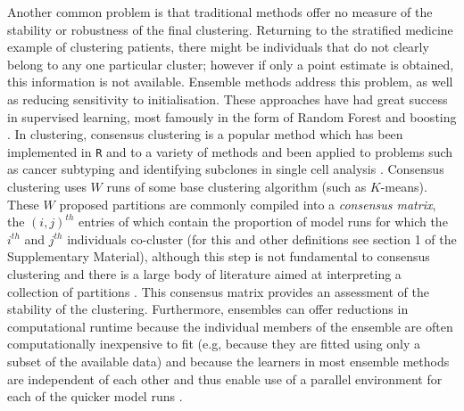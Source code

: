\documentclass{bmcart}
\begin{document}
Another common problem is that traditional methods offer  no  measure of the stability or robustness of the  final  clustering. Returning  to the  stratified  medicine example  of  clustering patients, there might be individuals that do not clearly belong to any one particular cluster; however if only a point estimate is obtained, this information is not available. %
Ensemble methods address this problem, as well as reducing sensitivity to initialisation. These approaches have had great success in supervised learning, most famously in the form of Random Forest \citep{breiman2001random} and boosting \citep{friedman2002stochastic}. In clustering, consensus clustering \citep{monti2003consensus} is a popular method which has been implemented in \texttt{R} \citep{wilkerson2010consensusclusterplus} and to a variety of methods \citep{john2020m3c, gu2020cola} and been applied to problems such as cancer subtyping \citep{lehmann2011identification, verhaak2010integrated} and identifying subclones in single cell analysis \citep{kiselev2017sc3}. Consensus clustering uses $W$ runs of some base clustering algorithm (such as $K$-means). These $W$ proposed partitions are commonly compiled into a \emph{consensus matrix}, the $(i, j)^{th}$ entries of which contain the proportion of model runs for which the $i^{th}$ and $j^{th}$ individuals co-cluster (for this and other definitions see section 1 of the Supplementary Material), although this step is not fundamental to consensus clustering and there is a large body of literature aimed at interpreting a collection of partitions \citep[see, e.g.,][]{LiWeightedConsensusClustering2008a,  CarpinetoConsensusClusteringBased2012,  StrehlClusterEnsemblesKnowledge}. This consensus matrix provides an assessment of the stability of the clustering. Furthermore, ensembles can offer reductions in computational runtime because the individual members of the ensemble are often computationally inexpensive to fit (e.g, because they are fitted using only a subset of the available data) and because the learners in most ensemble methods are independent of each other and thus enable use of a parallel environment for each of the quicker model runs \citep{ghaemi2009survey}. 
\end{document}
